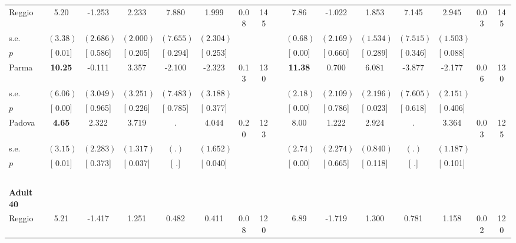 \begin{longtable}{L{8em} c c c c c c c p{1em} c c c c c c c}
\quad \quad \quad Reggio& 5.20 &    -1.253 &     2.233 &     7.880 &     1.999 &      0.08 &       145 & & 7.86 &    -1.022 &     1.853 &     7.145 & $ \mathbf{    2.945}$ &      0.03 &       145  \\*
\quad \quad \quad \quad s.e.& $ (     3.38)$ & $ (    2.686)$ & $ (    2.000)$ & $ (    7.655)$ & $ (    2.304)$ & & & & $ (     0.68)$ & $ (    2.169)$ & $ (    1.534)$ & $ (    7.515)$ & $ (    1.503)$ & &  \\*
\quad \quad \quad \quad $ p$ & [     0.01] & [    0.586] & [    0.205] & [    0.294] & [    0.253] & & & & [     0.00] & [    0.660] & [    0.289] & [    0.346] & [    0.088] & &  \\[1em]
\quad \quad \quad Parma& \textbf{    10.25} &    -0.111 &     3.357 &    -2.100 &    -2.323 &      0.13 &       130 & & \textbf{    11.38} &     0.700 & $ \mathbf{    6.081}$ &    -3.877 &    -2.177 &      0.06 &       130  \\*
\quad \quad \quad \quad s.e.& $ (     6.06)$ & $ (    3.049)$ & $ (    3.251)$ & $ (    7.483)$ & $ (    3.188)$ & & & & $ (     2.18)$ & $ (    2.109)$ & $ (    2.196)$ & $ (    7.605)$ & $ (    2.151)$ & &  \\*
\quad \quad \quad \quad $ p$ & [     0.00] & [    0.965] & [    0.226] & [    0.785] & [    0.377] & & & & [     0.00] & [    0.786] & [    0.023] & [    0.618] & [    0.406] & &  \\[1em]
\quad \quad \quad Padova& \textbf{     4.65} &     2.322 & $ \mathbf{    3.719}$ &         . & $ \mathbf{    4.044}$ &      0.20 &       123 & & 8.00 &     1.222 &     2.924 &         . &     3.364 &      0.03 &       125  \\*
\quad \quad \quad \quad s.e.& $ (     3.15)$ & $ (    2.283)$ & $ (    1.317)$ & $ (        .)$ & $ (    1.652)$ & & & & $ (     2.74)$ & $ (    2.274)$ & $ (    0.840)$ & $ (        .)$ & $ (    1.187)$ & &  \\*
\quad \quad \quad \quad $ p$ & [     0.01] & [    0.373] & [    0.037] & [        .] & [    0.040] & & & & [     0.00] & [    0.665] & [    0.118] & [        .] & [    0.101] & &  \\[1em]
~\\[1em]
\quad \quad \textbf{Adult 40} & & & & & & & & & & & & & & & \\* 
\quad \quad \quad Reggio& 5.21 &    -1.417 &     1.251 &     0.482 &     0.411 &      0.08 &       120 & & 6.89 &    -1.719 &     1.300 &     0.781 &     1.158 &      0.02 &       120  \\*

\end{longtable}
